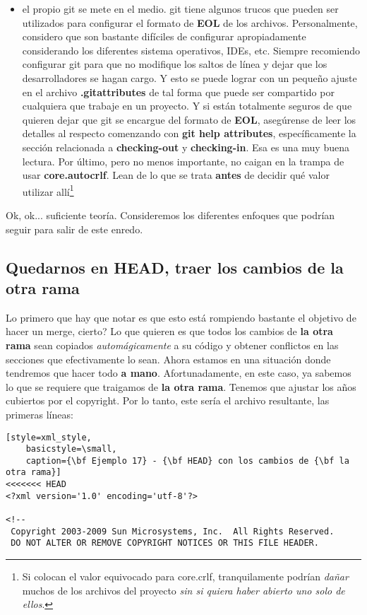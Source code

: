 \begin{itemize}
	\item {el propio git se mete en el medio}. git tiene algunos trucos que pueden ser utilizados para configurar el formato
	de {\bf EOL} de los archivos. Personalmente, considero que son bastante difíciles de configurar apropiadamente considerando
	los diferentes sistema operativos, IDEs, etc. Siempre recomiendo configurar git para que no modifique los saltos de línea y dejar
	que los desarrolladores se hagan cargo. Y esto se puede lograr con un pequeño ajuste en el archivo {\bf .gitattributes} de tal
	forma que puede ser compartido por cualquiera que trabaje en un proyecto. Y si están totalmente seguros de que quieren dejar que
	git se encargue del formato de {\bf EOL}, asegúrense de leer los detalles al respecto comenzando con {\bf git help attributes},
	específicamente la sección relacionada a {\bf checking-out} y {\bf checking-in}. Esa es una muy buena lectura. Por último,
	pero no menos importante, no caigan en la trampa de usar {\bf core.autocrlf}. Lean de lo que se trata {\bf antes} de decidir
	qué valor utilizar allí\footnote{Si colocan el valor equivocado para core.crlf, tranquilamente podrían {\it dañar} muchos de los
	archivos del proyecto {\it sin si quiera haber abierto uno solo de ellos}.}
	
\end{itemize}

Ok, ok... suficiente teoría. Consideremos los diferentes enfoques que podrían seguir para salir de este enredo.

\subsection*{Quedarnos en HEAD, traer los cambios de la otra rama}

Lo primero que hay que notar es que esto está rompiendo bastante el objetivo de hacer un merge, cierto? Lo que quieren es que
todos los cambios de {\bf la otra rama} sean copiados {\it automágicamente} a su código y obtener conflictos en las secciones
que efectivamente lo sean. Ahora estamos en una situación donde tendremos que hacer todo {\bf a mano}. Afortunadamente, en este caso,
ya sabemos lo que se requiere que traigamos de {\bf la otra rama}. Tenemos que ajustar los años cubiertos por el copyright.
Por lo tanto, este sería el archivo resultante, las primeras líneas:

\begin{lstlisting}[style=xml_style,
	basicstyle=\small,
	caption={\bf Ejemplo 17} - {\bf HEAD} con los cambios de {\bf la otra rama}]
<<<<<<< HEAD
<?xml version='1.0' encoding='utf-8'?>

<!--
 Copyright 2003-2009 Sun Microsystems, Inc.  All Rights Reserved.
 DO NOT ALTER OR REMOVE COPYRIGHT NOTICES OR THIS FILE HEADER.
\end{lstlisting}

